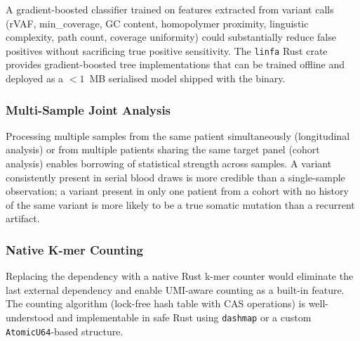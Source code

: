 A gradient-boosted classifier trained on features extracted from \kmerdet{}
variant calls (rVAF, min\_coverage, GC content, homopolymer proximity,
linguistic complexity, path count, coverage uniformity) could substantially
reduce false positives without sacrificing true positive sensitivity.  The
\texttt{linfa} Rust crate provides gradient-boosted tree implementations that
can be trained offline and deployed as a $<1$~MB serialised model shipped with
the binary.

\subsubsection{Multi-Sample Joint Analysis}

Processing multiple samples from the same patient simultaneously (longitudinal
analysis) or from multiple patients sharing the same target panel (cohort
analysis) enables borrowing of statistical strength across samples.  A variant
consistently present in serial blood draws is more credible than a single-sample
observation; a variant present in only one patient from a cohort with no history
of the same variant is more likely to be a true somatic mutation than a
recurrent artifact.

\subsubsection{Native K-mer Counting}

Replacing the \jf{} dependency with a native Rust k-mer counter would eliminate
the last external dependency and enable UMI-aware counting as a built-in
feature.  The counting algorithm (lock-free hash table with CAS operations) is
well-understood and implementable in safe Rust using \texttt{dashmap} or a
custom \texttt{AtomicU64}-based structure.
